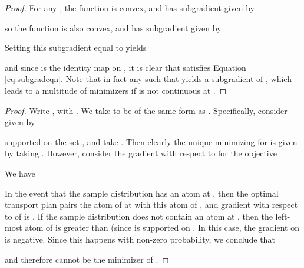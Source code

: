 \documentclass[letterpaper]{article}
\begin{document}
\wonemidpoint*

\begin{proof}
For any , the function  is convex, and has subgradient given by

so the function  is also convex, and has subgradient given by

Setting this subgradient equal to  yields

and since  is the identity map on , it is clear that  satisfies Equation \ref{eq:subgradeqn}. Note that in fact any  such that  yields a subgradient of , which leads to a multitude of minimizers if  is not continuous at .
\end{proof}

\biasedgradients*

\begin{proof}
Write , with . We take  to be of the same form as . Specifically, consider  given by

supported on the set ,
and take .
Then clearly the unique minimizing  for  is given by taking . However, consider the gradient with respect to  for the objective

We have

In the event that the sample distribution  has an atom at , then the optimal transport plan pairs the atom of  at  with this atom of , and gradient with respect to  of  is . If the sample distribution  does not contain an atom at , then the left-most atom of  is greater than  (since  is supported on . In this case, the gradient on  is negative. Since this happens with non-zero probability, we conclude that 

and therefore  cannot be the minimizer of .
\end{proof}

\Winftycontract*
\end{document}
